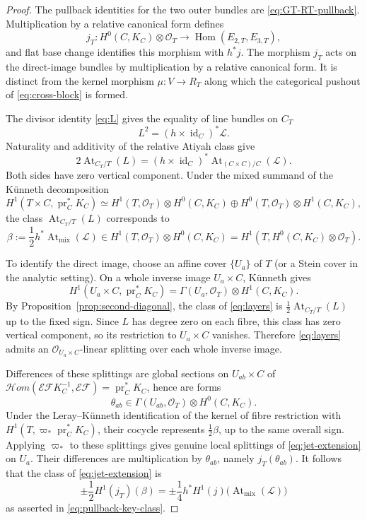\documentclass[11pt,a4paper,dvipsnames]{amsart}
\numberwithin{equation}{section}
\theoremstyle{plain}
\theoremstyle{definition}
\newcommand{\cO}{\mathcal O}
\newcommand{\cE}{\mathcal E}
\newcommand{\cF}{\mathcal F}
\newcommand{\cL}{\mathcal L}
\newcommand{\At}{\operatorname{At}}
\newcommand{\Hom}{\operatorname{Hom}}
\newcommand{\id}{\operatorname{id}}
\newcommand{\cHom}{\mathcal{H}om}
\begin{document}
\begin{proof}
The pullback identities for the two outer bundles are
\eqref{eq:GT-RT-pullback}.  Multiplication by a relative canonical form
defines
$$
 j_T:H^0(C,K_C)\otimes\cO_T
 \longrightarrow\Hom(E_{2,T},E_{3,T}),
$$
and flat base change identifies this morphism with $h^*j$.  The morphism
$j_T$ acts on the direct-image bundles by multiplication by a relative
canonical form.  It is distinct from the kernel morphism
$\mu:V\to R_T$ along which the categorical pushout of
\eqref{eq:cross-block} is formed.

The divisor identity \eqref{eq:L} gives the equality of line bundles on
$C_T$
\begin{equation}\label{eq:L-square-pullback}
 L^2=(h\times\id_C)^*\cL.
\end{equation}
Naturality and additivity of the relative Atiyah class give
\begin{equation}\label{eq:At-pullback-identity}
 2\At_{C_T/T}(L)
 =(h\times\id_C)^*
   \At_{(C\times C)/C}(\cL).
\end{equation}
Both sides have zero vertical component.  Under the mixed summand of the
K\"unneth decomposition
$$
H^1(T\times C,\operatorname{pr}_C^*K_C)
\simeq H^1(T,\cO_T)\otimes H^0(C,K_C)
 \oplus H^0(T,\cO_T)\otimes H^1(C,K_C),
$$
the class $\At_{C_T/T}(L)$ corresponds to
\begin{equation}\label{eq:beta-class}
 \beta:=\frac12h^*\At_{\mathrm{mix}}(\cL)
 \in H^1(T,\cO_T)\otimes H^0(C,K_C)
 =H^1\!\left(T,H^0(C,K_C)\otimes\cO_T\right).
\end{equation}

To identify the direct image, choose an affine cover $\{U_a\}$ of
$T$ (or a Stein cover in the analytic setting).  On a whole inverse image
$U_a\times C$, K\"unneth gives
$$
 H^1(U_a\times C,\operatorname{pr}_C^*K_C)
 =\Gamma(U_a,\cO_T)\otimes H^1(C,K_C).
$$
By Proposition~\ref{prop:second-diagonal}, the class of
\eqref{eq:layers} is $\frac12\At_{C_T/T}(L)$ up to the fixed sign.
Since $L$ has degree zero on each fibre, this class has zero vertical
component, so its restriction to $U_a\times C$ vanishes.
Therefore \eqref{eq:layers} admits an $\cO_{U_a\times C}$-linear splitting
over each whole inverse image.

Differences of these splittings are global sections on $U_{ab}\times C$ of
$\cHom(\cE\cF K_C^{-1},\cE\cF)=\operatorname{pr}_C^*K_C$, hence are forms
$$
 \theta_{ab}\in\Gamma(U_{ab},\cO_T)\otimes H^0(C,K_C).
$$
Under the Leray--K\"unneth identification of the kernel of fibre
restriction with $H^1(T,\varpi_*\operatorname{pr}_C^*K_C)$, their cocycle
represents $\frac12\beta$, up to the same overall sign.
Applying $\varpi_*$ to these splittings gives genuine local splittings
of \eqref{eq:jet-extension} on $U_a$.  Their differences are multiplication
by $\theta_{ab}$, namely $j_T(\theta_{ab})$.
It follows that the class of \eqref{eq:jet-extension} is
$$
 \pm\frac12H^1(j_T)(\beta)
 =\pm\frac14h^*H^1(j)
   \bigl(\At_{\mathrm{mix}}(\cL)\bigr)
$$
as asserted in \eqref{eq:pullback-key-class}. 



\end{proof}
\end{document}
